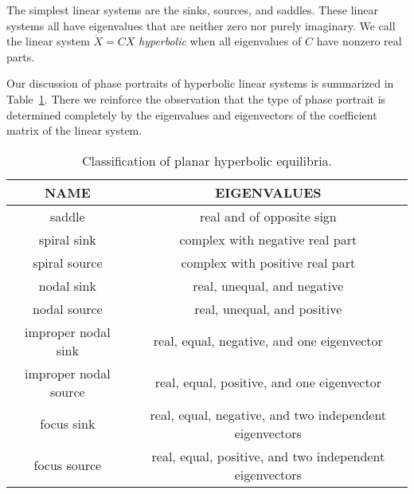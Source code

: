 \documentclass{ximera}
\begin{document}
The simplest linear systems are the sinks, sources, and saddles.
These linear systems all have eigenvalues that are neither zero
nor purely imaginary.  We call the linear system $\dot{X}=CX$
{\em hyperbolic\/} when all eigenvalues of $C$ have nonzero
real parts.  

Our discussion of phase portraits of hyperbolic linear systems is
summarized in Table~\ref{T:hyperbolic}.  There we reinforce the
observation that the type of phase portrait is determined completely
by the eigenvalues and eigenvectors of the coefficient matrix of the
linear system.

\begin{table}[htb]
\begin{tabular}{|c|c|}
\hline
NAME & EIGENVALUES \\
\hline
saddle    & real and of opposite sign\\
\hline
spiral  sink & complex with negative real part \\
spiral source & complex with positive real part \\
\hline
nodal sink & real, unequal, and negative\\
nodal source & real, unequal, and positive\\
\hline
improper nodal sink & real, equal, negative, and one eigenvector\\
improper nodal source & real, equal, positive, and one eigenvector\\
\hline
focus sink & real, equal, negative, and two independent eigenvectors\\
focus source & real, equal, positive, and two independent eigenvectors\\
\hline
\end{tabular}
\caption{Classification of planar hyperbolic equilibria.}
\label{T:hyperbolic}
\end{table}
\end{document}
